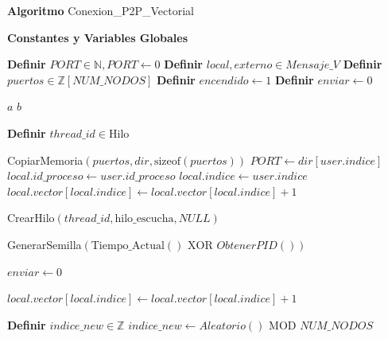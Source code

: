 \begin{tcolorbox}[colback=white, colframe=azul_unam, title=Pseudocódigo: cnx\_vectores.c (Conexión P2P Vectorial), breakable]

\textbf{Algoritmo} Conexion\_P2P\_Vectorial


\textbf{Constantes y Variables Globales}

\begin{algorithmic}[1]

\State \textbf{Definir} $PORT \in \mathbb{N}, PORT \gets 0$
\State \textbf{Definir} $local, externo \in Mensaje\_V$
\State \textbf{Definir} $puertos \in \mathbb{Z}[NUM\_NODOS]$
\State \textbf{Definir} $encendido \gets 1$
\State \textbf{Definir} $enviar \gets 0$

\vspace{0.2cm}


        \State \Return $a$
    \Else
        \State \Return $b$
    \EndIf
\EndProcedure

\vspace{0.3cm}



    \State \textbf{Definir} $thread\_id \in \text{Hilo}$
    
    \State CopiarMemoria$(puertos, dir, \text{sizeof}(puertos))$
    \State $PORT \gets dir[user.indice]$
    \State $local.id\_proceso \gets user.id\_proceso$
    \State $local.indice \gets user.indice$
    \State $local.vector[local.indice] \gets local.vector[local.indice] + 1$ 

    \State CrearHilo$(thread\_id, \text{hilo\_escucha}, NULL)$
    
    \State GenerarSemilla$(\text{Tiempo\_Actual}() \text{ XOR } ObtenerPID())$

    
            \State $enviar \gets 0$
            
            \State $local.vector[local.indice] \gets local.vector[local.indice] + 1$ 
            
            \State \textbf{Definir} $indice\_new \in \mathbb{Z}$
            \Repeat
                \State $indice\_new \gets Aleatorio() \text{ MOD } NUM\_NODOS$
             
            

\end{algorithmic}
\end{tcolorbox}
